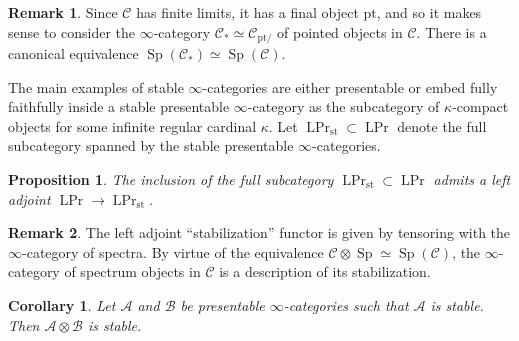 \documentclass[12pt]{article}
\newtheorem{corollary}{Corollary}[subsection]
\newtheorem{proposition}{Proposition}[subsection]
\theoremstyle{definition}
\newtheorem{remark}{Remark}[subsection]
\newcommand{\A}{\mathcal{A}}
\newcommand{\B}{\mathcal{B}}
\newcommand{\C}{\mathcal{C}}
\renewcommand{\i}{\infty}
\DeclareMathOperator{\Prl}{LPr}
\DeclareMathOperator{\Sp}{Sp}
\newcommand{\st}{\mathrm{st}}
\newcommand{\pt}{\mathrm{pt}}
\begin{document}
\begin{remark}
Since $\C$ has finite limits, it has a final object $\pt$, and so it makes sense to consider the $\infty$-category $\C_*\simeq\C_{\pt/}$ of pointed objects in $\C$.
There is a canonical equivalence $\Sp(\C_*)\simeq\Sp(\C)$.
\end{remark}



The main examples of stable $\infty$-categories are either presentable or embed fully faithfully inside a stable presentable $\infty$-category as the subcategory of $\kappa$-compact objects for some infinite regular cardinal $\kappa$.
Let $\Prl_{\st}\subset\Prl$\index{$\Prl_{\st}$} denote the full subcategory spanned by the stable presentable $\infty$-categories.
\begin{proposition}{\em \cite[Proposition 4.8.2.18]{HA}}
The inclusion of the full subcategory $\Prl_{\st}\subset\Prl$ admits a left adjoint $\Prl\to\Prl_{\st}$.
\end{proposition}
\begin{remark}
The left adjoint ``stabilization'' functor is given by tensoring with the $\i$-category of spectra.
By virtue of the equivalence
$\C\otimes\Sp\simeq\Sp(\C)$, the $\i$-category of spectrum objects in $\C$ is a description of its stabilization.
\end{remark}

\begin{corollary}
Let $\A$ and $\B$ be presentable $\infty$-categories such that $\A$ is stable.
Then $\A\otimes\B$ is stable.
\end{corollary}
\end{document}
